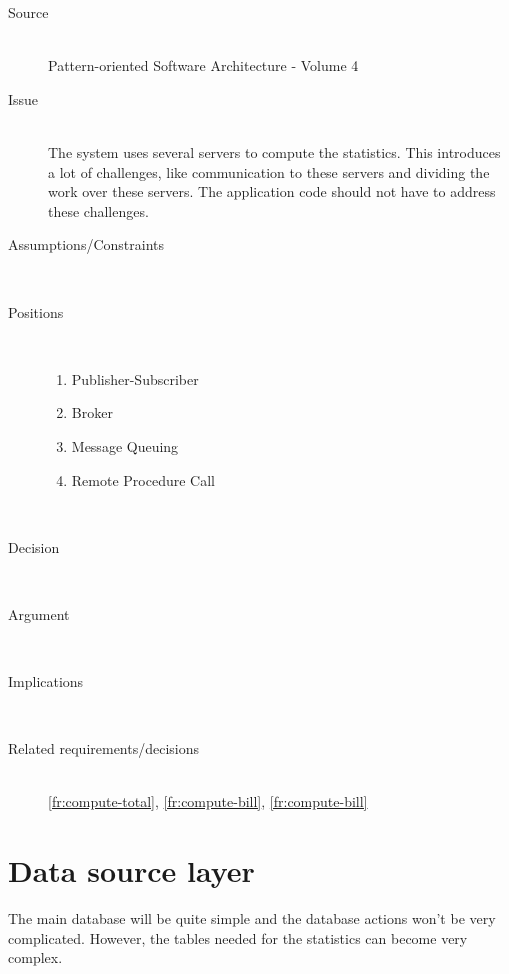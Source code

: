 \begin{description}
\item [Source]~\\
Pattern-oriented Software Architecture - Volume 4 \cite{wiley-4}

\item [Issue]~\\
The system uses several servers to compute the statistics. This introduces a lot of challenges, like communication to these servers and dividing the work over these servers. The application code should not have to address these challenges.

\item [Assumptions/Constraints]~\\

\item [Positions]~
\begin{enumerate}
\item Publisher-Subscriber
\item Broker
\item Message Queuing
\item Remote Procedure Call
\end{enumerate}
~\\[-1.5cm]

\item [Decision] ~\\


\item [Argument]~\\


\item [Implications]~\\


\item [Related requirements/decisions]~\\
\ref{fr:compute-total}, \ref{fr:compute-bill}, \ref{fr:compute-bill}

\end{description}


\section{Data source layer}
The main database will be quite simple and the database actions won't be very complicated. However, the tables needed for the statistics can become very complex.

